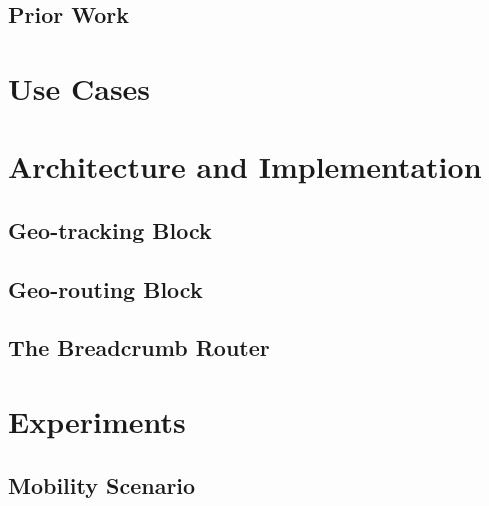 \documentclass{sig-alternate}
\begin{document}
\subsection {Prior Work}


%
%
\section{Use Cases}


%
%
\section{Architecture and Implementation}


\subsection{Geo-tracking Block}

\subsection{Geo-routing Block}

\subsection{The Breadcrumb Router}


%
%
\section{Experiments}

\subsection{Mobility Scenario}
\end{document}
